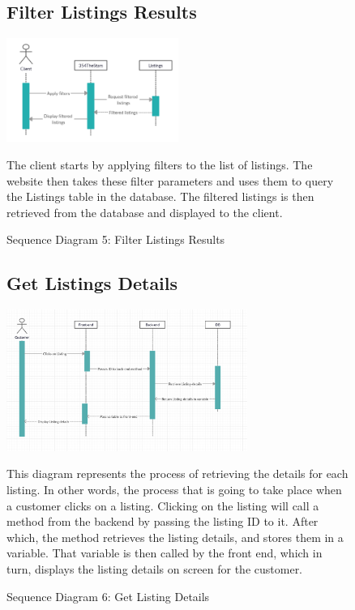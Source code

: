 \documentclass[11pt]{article}
\newcounter{use case ID}
\begin{document}
\begin{figure}[ht!]
    \subsection{Filter Listings Results}
    \centering
    \includegraphics[width=0.5\textwidth,height=0.15\paperheight]{Diagrams/Sequence/Filter_Listings.jpg} 
    \caption{Sequence Diagram 5: Filter Listings Results}
    \label{fig: Filter Listings Results}
    \begin{flushleft}
        The client starts by applying filters to the list of listings. The website then takes these filter parameters and uses them to query the Listings table in the database. The filtered listings is then retrieved from the database and displayed to the client.
    \end{flushleft}
\end{figure}

\begin{figure}[ht!]
    \subsection{Get Listings Details}
    \centering
    \includegraphics[width=0.7\textwidth,height=0.25\paperheight]{Diagrams/Sequence/Listing_Details.png} 
    \caption{Sequence Diagram 6: Get Listing Details}
    \label{fig: Get Listing Details}
    \begin{flushleft}
        This diagram represents the process of retrieving the details for each listing. In other words, the process that is going to take place when a customer clicks on a listing. Clicking on the listing will call a method from the backend by passing the listing ID to it. After which, the method retrieves the listing details, and stores them in a variable. That variable is then called by the front end, which in turn, displays the listing details on screen for the customer.
    \end{flushleft}
\end{figure}
\end{document}
